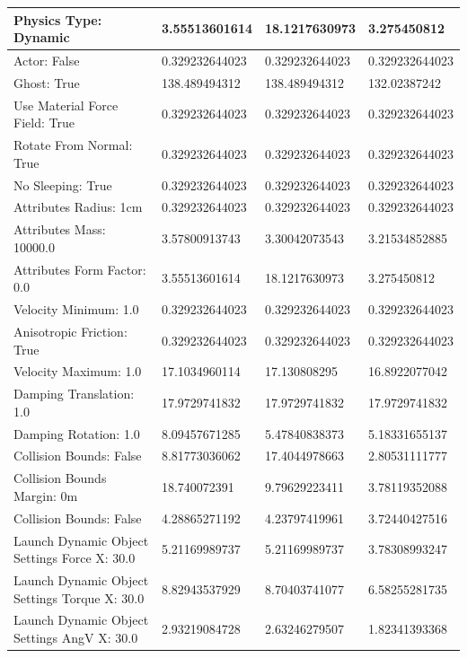 \begin{table}[htbp]
\begin{tabular}{ | l || l | l | l | }
Physics Type: Dynamic & 3.55513601614  & 18.1217630973  & 3.275450812 \\ \hline
\rowcolor{cyan}
Actor: False & 0.329232644023  & 0.329232644023  & 0.329232644023 \\ \hline
Ghost: True & 138.489494312  & 138.489494312  & 132.02387242 \\ \hline
\rowcolor{cyan}
Use Material Force Field: True & 0.329232644023  & 0.329232644023  & 0.329232644023 \\ \hline
\rowcolor{cyan}
Rotate From Normal: True & 0.329232644023  & 0.329232644023  & 0.329232644023 \\ \hline
\rowcolor{cyan}
No Sleeping: True & 0.329232644023  & 0.329232644023  & 0.329232644023 \\ \hline
\rowcolor{cyan}
Attributes Radius: 1cm & 0.329232644023  & 0.329232644023  & 0.329232644023 \\ \hline
Attributes Mass: 10000.0 & 3.57800913743  & 3.30042073543  & 3.21534852885 \\ \hline
Attributes Form Factor: 0.0 & 3.55513601614  & 18.1217630973  & 3.275450812 \\ \hline
\rowcolor{cyan}
Velocity Minimum: 1.0 & 0.329232644023  & 0.329232644023  & 0.329232644023 \\ \hline
\rowcolor{cyan}
Anisotropic Friction: True & 0.329232644023  & 0.329232644023  & 0.329232644023 \\ \hline
Velocity Maximum: 1.0 & 17.1034960114  & 17.130808295  & 16.8922077042 \\ \hline
Damping Translation: 1.0 & 17.9729741832 & 17.9729741832 & 17.9729741832 \\ \hline
Damping Rotation: 1.0 & 8.09457671285 & 5.47840838373 & 5.18331655137 \\ \hline
Collision Bounds: False & 8.81773036062 & 17.4044978663 & 2.80531111777 \\ \hline
Collision Bounds Margin: 0m & 18.740072391  & 9.79629223411  & 3.78119352088 \\ \hline
Collision Bounds: False & 4.28865271192  & 4.23797419961  & 3.72440427516 \\ \hline
Launch Dynamic Object Settings Force X: 30.0 & 5.21169989737  & 5.21169989737  & 3.78308993247 \\ \hline
Launch Dynamic Object Settings Torque X: 30.0 & 8.82943537929  & 8.70403741077  & 6.58255281735 \\ \hline
Launch Dynamic Object Settings AngV X: 30.0 & 2.93219084728  & 2.63246279507  & 1.82341393368 \\ \hline

\end{tabular}
\end{table}
